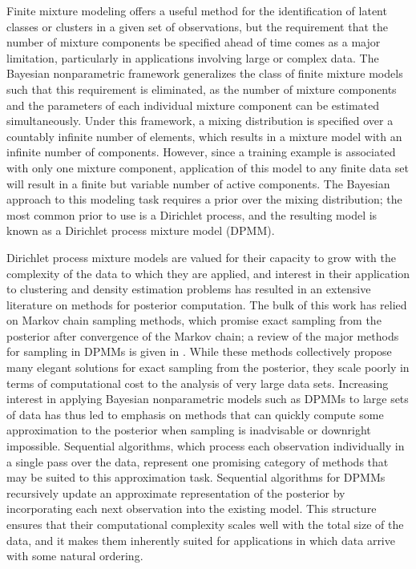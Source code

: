 \documentclass{uwstat572}
\begin{document}
Finite mixture modeling offers a useful method for the identification of latent classes or clusters in a given set of observations, but the requirement that the number of mixture components be specified ahead of time comes as a major limitation, particularly in applications involving large or complex data. The Bayesian nonparametric framework generalizes the class of finite mixture models such that this requirement is eliminated, as the number of mixture components and the parameters of each individual mixture component can be estimated simultaneously. Under this framework, a mixing distribution is specified over a countably infinite number of elements, which results in a mixture model with an infinite number of components. However, since a training example is associated with only one mixture component, application of this model to any finite data set will result in a finite but variable number of active components. The Bayesian approach to this modeling task requires a prior over the mixing distribution; the most common prior to use is a Dirichlet process, and the resulting model is known as a Dirichlet process mixture model (DPMM). 

Dirichlet process mixture models are valued for their capacity to grow with the complexity of the data to which they are applied, and interest in their application to clustering and density estimation problems has resulted in an extensive literature on methods for posterior computation. The bulk of this work has relied on Markov chain sampling methods, which promise exact sampling from the posterior after convergence of the Markov chain; a review of the major methods for sampling in DPMMs is given in \citet{neal}. While these methods collectively propose many elegant solutions for exact sampling from the posterior, they scale poorly in terms of computational cost to the analysis of very large data sets. Increasing interest in applying Bayesian nonparametric models such as DPMMs to large sets of data has thus led to emphasis on methods that can quickly compute some approximation to the posterior when sampling is inadvisable or downright impossible. Sequential algorithms, which process each observation individually in a single pass over the data, represent one promising category of methods that may be suited to this approximation task. Sequential algorithms for DPMMs recursively update an approximate representation of the posterior by incorporating each next observation into the existing model. This structure ensures that their computational complexity scales well with the total size of the data, and it makes them inherently suited for applications in which data arrive with some natural ordering.
\end{document}

